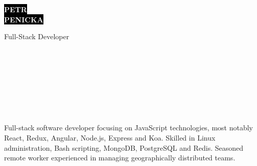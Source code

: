 \documentclass[9pt]{developercv}
\begin{document}
\begin{minipage}[t]{0.45\textwidth}
  \vspace{-\baselineskip}

  \colorbox{black}{{\HUGE\textcolor{white}{\textbf{\MakeUppercase{Petr}}}}}
  \\
  \colorbox{black}{{\HUGE\textcolor{white}{\textbf{\MakeUppercase{Penicka}}}}}

  \vspace{6pt}

  {\huge Full-Stack Developer}
\end{minipage}
\begin{minipage}[t]{0.275\textwidth}
  \vspace{-\baselineskip}

  \\
  \\
  \\
\end{minipage}
\begin{minipage}[t]{0.3\textwidth}
  \vspace{-\baselineskip}

  \\
  \\
  \\
\end{minipage}

\vspace{0.5cm}


\begin{minipage}[t]{1\textwidth}
  \vspace{-\baselineskip}

  {Full-stack software developer focusing on JavaScript technologies, most notably React, Redux, Angular, Node.js, Express and Koa.
    Skilled in Linux administration, Bash scripting, MongoDB, PostgreSQL and Redis.
    Seasoned remote worker experienced in managing geographically distributed teams.}\\
\end{minipage}

\end{document}
